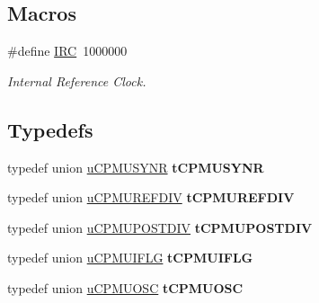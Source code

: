 \subsection*{Macros}
\begin{DoxyCompactItemize}
\item 
\hypertarget{group___c_p_m_u_ga3df87df601ded076d7ee57e7200f6ad2}{}\#define \hyperlink{group___c_p_m_u_ga3df87df601ded076d7ee57e7200f6ad2}{I\+R\+C}~1000000\label{group___c_p_m_u_ga3df87df601ded076d7ee57e7200f6ad2}

\begin{DoxyCompactList}\small\item\em Internal Reference Clock. \end{DoxyCompactList}\end{DoxyCompactItemize}
\subsection*{Typedefs}
\begin{DoxyCompactItemize}
\item 
\hypertarget{group___c_p_m_u_ga09fdb8f378f7177fe7efcb84ce56dc4f}{}typedef union \hyperlink{unionu_c_p_m_u_s_y_n_r}{u\+C\+P\+M\+U\+S\+Y\+N\+R} {\bfseries t\+C\+P\+M\+U\+S\+Y\+N\+R}\label{group___c_p_m_u_ga09fdb8f378f7177fe7efcb84ce56dc4f}

\item 
\hypertarget{group___c_p_m_u_ga0d59cf5c260adccf39a5a1a8411c6aaf}{}typedef union \hyperlink{unionu_c_p_m_u_r_e_f_d_i_v}{u\+C\+P\+M\+U\+R\+E\+F\+D\+I\+V} {\bfseries t\+C\+P\+M\+U\+R\+E\+F\+D\+I\+V}\label{group___c_p_m_u_ga0d59cf5c260adccf39a5a1a8411c6aaf}

\item 
\hypertarget{group___c_p_m_u_gab79188554bbbeddd0770fb3a3cd2d637}{}typedef union \hyperlink{unionu_c_p_m_u_p_o_s_t_d_i_v}{u\+C\+P\+M\+U\+P\+O\+S\+T\+D\+I\+V} {\bfseries t\+C\+P\+M\+U\+P\+O\+S\+T\+D\+I\+V}\label{group___c_p_m_u_gab79188554bbbeddd0770fb3a3cd2d637}

\item 
\hypertarget{group___c_p_m_u_ga19bfa68ca49953534f3b3efa1682c911}{}typedef union \hyperlink{unionu_c_p_m_u_i_f_l_g}{u\+C\+P\+M\+U\+I\+F\+L\+G} {\bfseries t\+C\+P\+M\+U\+I\+F\+L\+G}\label{group___c_p_m_u_ga19bfa68ca49953534f3b3efa1682c911}

\item 
\hypertarget{group___c_p_m_u_ga730dc475c6839ab6aad5ca55af407165}{}typedef union \hyperlink{unionu_c_p_m_u_o_s_c}{u\+C\+P\+M\+U\+O\+S\+C} {\bfseries t\+C\+P\+M\+U\+O\+S\+C}\label{group___c_p_m_u_ga730dc475c6839ab6aad5ca55af407165}

\end{DoxyCompactItemize}
